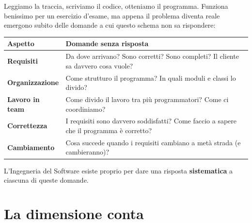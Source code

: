 \begin{center}
\end{center}

Leggiamo la traccia, scriviamo il codice, otteniamo il programma. Funziona benissimo per un esercizio d'esame,
ma appena il problema diventa reale emergono subito delle domande a cui questo schema non sa rispondere:

\begin{table}[H]
\centering
\renewcommand{\arraystretch}{1.35}
\begin{tabularx}{\textwidth}{>{\bfseries}P{3.9cm} L}
\toprule
Aspetto & Domande senza risposta \\
\midrule
Requisiti & Da dove arrivano? Sono corretti? Sono completi? Il cliente sa davvero cosa vuole? \\
Organizzazione & Come strutturo il programma? In quali moduli e classi lo divido? \\
Lavoro in team & Come divido il lavoro tra più programmatori? Come ci coordiniamo? \\
Correttezza & I requisiti sono davvero soddisfatti? Come faccio a sapere che il programma è corretto? \\
Cambiamento & Cosa succede quando i requisiti cambiano a metà strada (e cambieranno)? \\
\bottomrule
\end{tabularx}
\end{table}

L'Ingegneria del Software esiste proprio per dare una risposta \textbf{sistematica} a ciascuna di queste domande.

\section{La dimensione conta}


